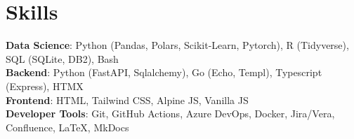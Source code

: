 \section{Skills}

\begin{itemize}[leftmargin=0.15in, label={}]
    \small{\item{
                    \textbf{Data Science}{: Python (Pandas, Polars, Scikit-Learn, Pytorch), R (Tidyverse), SQL (SQLite, DB2), Bash } \\
                    \textbf{Backend}{: Python (FastAPI, Sqlalchemy), Go (Echo, Templ), Typescript (Express), HTMX } \\
                    \textbf{Frontend}{: HTML, Tailwind CSS, Alpine JS, Vanilla JS } \\
                    \textbf{Developer Tools}{: Git, GitHub Actions, Azure DevOps, Docker, Jira/Vera, Confluence, LaTeX, MkDocs} \\
              }}
\end{itemize}
